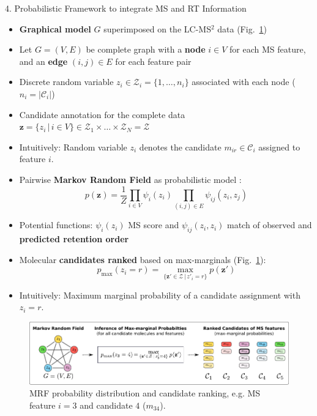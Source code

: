 \documentclass{beamer}
\newcommand{\ms}{MS}
\newcommand{\lc}{LC}
\newcommand{\msms}{\ms$^2$}
\newcommand{\lcmsms}{\lc-\msms}
\newcommand{\cands}{\mathcal{C}}
\newcommand{\seqlength}{N}
\begin{document}
\begin{frame}{}
\begin{columns}[T]
\hfill
{}
    \begin{block}{{\normalsize 4. Probabilistic Framework to integrate \ms{} and RT Information}}
    \begin{itemize}
        \item \textbf{Graphical model} $G$ superimposed on the \lcmsms{} data (Fig.~\ref{fig:mrf_and_ranking})
        \item Let $G=(V,E)$ be complete graph with a \textbf{node} $i\in V$ for each \ms{} feature, and an \textbf{edge} $(i,j)\in E$ for each feature pair 
        \item Discrete random variable $z_i\in\mathcal{Z}_i=\{1,\ldots,n_i\}$ associated with each node ($n_i=|\cands_i|$)
        \item Candidate annotation for the complete data $\mathbf{z}=\{z_i\,|\,i\in V\}\in\mathcal{Z}_1\times\ldots\times\mathcal{Z}_\seqlength=\mathcal{Z}$
        \item Intuitively: Random variable $z_i$ denotes the candidate $m_{ir}\in\mathcal{C}_i$ assigned to feature $i$.
        \item Pairwise \textbf{Markov Random Field} as probabilistic model \cite{MacKay2005}:
            \begin{equation}
                p(\mathbf{z})=\frac{1}{Z}\prod_{i\in V}\psi_i(z_i)\prod_{(i,j)\in E}\psi_{ij}(z_i,z_j)
                \label{eq:mrf}
            \end{equation} 
        \item Potential functions: $\psi_i(z_i)$ \ms{} score and $\psi_{ij}(z_i,z_i)$ match of observed and \textbf{predicted retention order}
        \item Molecular \textbf{candidates ranked} based on max-marginals \cite{MacKay2005} (Fig.~\ref{fig:mrf_and_ranking}):
            \begin{equation}
                p_{\max}(z_i=r)=\underset{\{\mathbf{z}'\in\mathcal{Z}\,|\,z'_i=r\}}{\max}p(\mathbf{z}')
            \end{equation}
        \item Intuitively: Maximum marginal probability of a candidate assignment with $z_i=r$.
    \end{itemize}
    \vspace{0.25cm}
    \begin{figure}
        \centering
        \includegraphics[width=\textwidth]{images/mrf_and_ranking.pdf}
        \caption{MRF probability distribution and candidate ranking, e.g. \ms{} feature $i=3$ and candidate $4$ ($m_{34}$).}
        \label{fig:mrf_and_ranking}
    \end{figure}
    \vspace{-0.75cm}
    \end{block}


\end{columns}
\end{frame}
\end{document}

